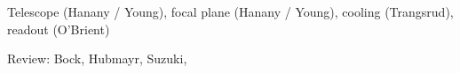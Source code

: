 \documentclass[PICOReport.tex]{subfiles}
\begin{document}
Telescope (Hanany / Young), focal plane (Hanany / Young), cooling (Trangsrud), readout (O'Brient) 

Review: Bock, Hubmayr, Suzuki, 
\end{document}
